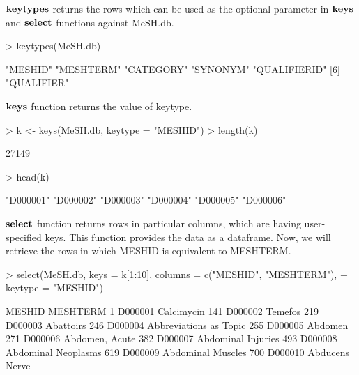 \documentclass[11pt]{article}
\begin{document}
$\bf{keytypes}$ returns the rows which can be used as the optional parameter in $\bf{keys}$ and $\bf{select}$ functions against MeSH.db.

\begin{center}
\begin{Schunk}
\begin{Sinput}
> keytypes(MeSH.db)
\end{Sinput}
\begin{Soutput}
[1] "MESHID"      "MESHTERM"    "CATEGORY"    "SYNONYM"     "QUALIFIERID"
[6] "QUALIFIER"  
\end{Soutput}
\end{Schunk}
\end{center}

\newpage
$\bf{keys}$ function returns the value of keytype.
\begin{center}
\begin{Schunk}
\begin{Sinput}
> k <- keys(MeSH.db, keytype = "MESHID")
> length(k)
\end{Sinput}
\begin{Soutput}
[1] 27149
\end{Soutput}
\begin{Sinput}
> head(k)
\end{Sinput}
\begin{Soutput}
[1] "D000001" "D000002" "D000003" "D000004" "D000005" "D000006"
\end{Soutput}
\end{Schunk}
\end{center}

$\bf{select}$ function returns rows in particular columns, which are having user-specified keys. This function provides the data as a dataframe. Now, we will retrieve the rows in which MESHID is equivalent to MESHTERM.
\begin{center}
\begin{Schunk}
\begin{Sinput}
> select(MeSH.db, keys = k[1:10], columns = c("MESHID", "MESHTERM"), 
+     keytype = "MESHID")
\end{Sinput}
\begin{Soutput}
     MESHID               MESHTERM
1   D000001             Calcimycin
141 D000002                Temefos
219 D000003              Abattoirs
246 D000004 Abbreviations as Topic
255 D000005                Abdomen
271 D000006         Abdomen, Acute
382 D000007     Abdominal Injuries
493 D000008    Abdominal Neoplasms
619 D000009      Abdominal Muscles
700 D000010         Abducens Nerve
\end{Soutput}
\end{Schunk}
\end{center}
\end{document}
